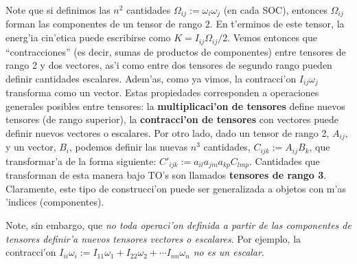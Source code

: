 Note que si definimos las $n^2$ cantidades $\Omega_{ij}:=\omega_i\omega_j$ (en cada SOC), entonces $\Omega_{ij}$ forman las componentes de un tensor de rango 2. En t'erminos de este tensor, la energ'ia cin'etica puede escribirse como $K=I_{ij}\Omega_{ij}/2$. Vemos entonces que ``contracciones'' (es decir, sumas de productos de componentes) entre tensores de rango 2 y dos vectores, as'i como entre dos tensores de segundo rango pueden definir cantidades escalares. Adem'as, como ya vimos, la contracci'on $I_{ij}\omega_j$ transforma como un vector. Estas propiedades corresponden a operaciones generales posibles entre tensores: la \textbf{multiplicaci'on de tensores} define nuevos tensores (de rango superior), la \textbf{contracci'on de tensores} con vectores puede definir nuevos vectores o escalares. Por otro lado, dado un tensor de rango 2, $A_{ij}$, y un vector, $B_i$, podemos definir las nuevas $n^3$ cantidades, $C_{ijk}:=A_{ij}B_k$, que transformar'a de la forma siguiente: $C'_{ijk}:=a_{il}a_{jm}a_{kp}C_{lmp}$. Cantidades que transforman de esta manera bajo TO's son llamados \textbf{tensores de rango 3}. Claramente, este tipo de construcci'on puede ser generalizada a objetos con m'as 'indices (componentes). 

 Note, sin embargo, que \textit{no toda operaci'on definida a partir de las componentes de tensores definir'a nuevos tensores vectores o escalares}. Por ejemplo, la contracci'on $I_{ii}\omega_i:=I_{11}\omega_1+I_{22}\omega_2+\cdots I_{nn}\omega_n$ \textit{no es un escalar}.

